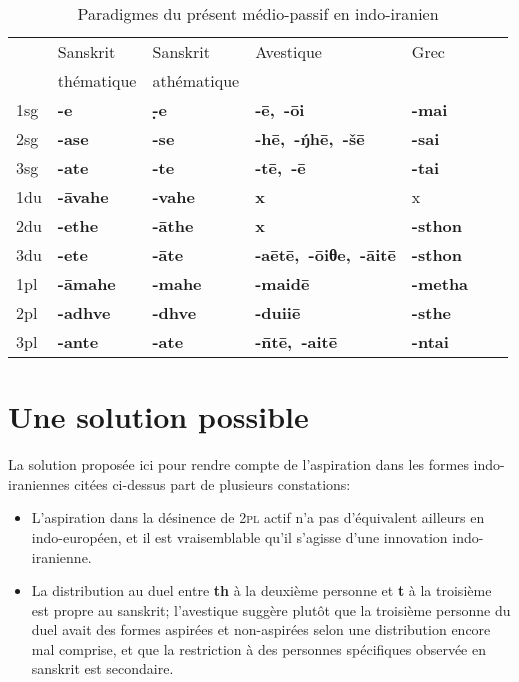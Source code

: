 \documentclass[oneside,a4paper,11pt]{article}
\newcommand{\ipa}[1]{{\phon\mbox{\textbf{#1}}}}
\newcommand{\grise}[1]{\cellcolor{lightgray}\textbf{#1}}
\begin{document}
\begin{table}[H]
\caption{Paradigmes du présent médio-passif  en indo-iranien}  \label{tab:medio}
\begin{tabular}{lllllll}
\toprule
 & 	Sanskrit  & 	Sanskrit & 	Avestique & 	Grec & 	\\
 &thématique&athématique&&\\
 \midrule
1sg & 	\ipa{-e} & 	\ipa{-̣e} & 	\ipa{-ē, -ōi} & 	\ipa{-mai} & 	\\
2sg & 	\ipa{-ase} & 	\ipa{-se} & 	\ipa{-hē, -ŋ́hē, -šē} & 	\ipa{-sai} & 	\\
3sg & 	\ipa{-ate} & 	\ipa{-te} & 	\ipa{-tē, -ē} & 	\ipa{-tai} & 	\\
1du & 	\ipa{-āvahe} & 	\ipa{-vahe} & 	\ipa{x} & 	x& 	\\
2du & 	\ipa{-ethe} \grise{}& 	\ipa{-āthe} \grise{}& 	\ipa{x} \grise{}& 		\ipa{-sthon} & 	\\
3du & 	\ipa{-ete}\grise{} & 	\ipa{-āte}\grise{} & 	\ipa{-aētē, -ōiθe, -āitē} \grise{}& 	\ipa{-sthon} & 	\\
1pl & 	\ipa{-āmahe} & 	\ipa{-mahe} & 	\ipa{-maidē} & 	\ipa{-metha}& 	\\
2pl & 	\ipa{-adhve} & 	\ipa{-dhve} & 	\ipa{-duiiē} & 	\ipa{-sthe} & 	\\
3pl & 	\ipa{-ante} & 	\ipa{-ate} & 	\ipa{-n̄tē, -aitē} & 	\ipa{-ntai} & 	\\
\bottomrule
\end{tabular}
\end{table}



 
\section{Une solution possible}
La solution proposée ici pour rendre compte de l'aspiration dans les formes indo-iraniennes citées ci-dessus part de plusieurs constations:

\begin{itemize}
\item L'aspiration dans la désinence de \textsc{2pl} actif n'a pas d'équivalent ailleurs en indo-européen, et il est vraisemblable qu'il s'agisse d'une innovation indo-iranienne.
\item La distribution au duel entre \ipa{th} à la deuxième personne et \ipa{t} à la troisième est propre au sanskrit; l'avestique suggère plutôt que la troisième personne du duel avait des formes aspirées et non-aspirées selon une distribution encore mal comprise, et que la restriction à des personnes spécifiques observée en sanskrit est secondaire.
\end{itemize}
\end{document}
